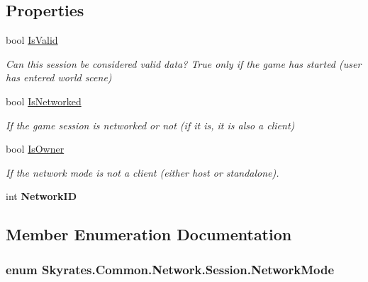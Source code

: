 \subsection*{Properties}
\begin{DoxyCompactItemize}
\item 
bool \hyperlink{class_skyrates_1_1_common_1_1_network_1_1_session_a73011cb9fda86ee41cf5964989d1b9c2}{Is\-Valid}
\begin{DoxyCompactList}\small\item\em Can this session be considered valid data? True only if the game has started (user has entered world scene) \end{DoxyCompactList}\item 
bool \hyperlink{class_skyrates_1_1_common_1_1_network_1_1_session_a9502bbd3da8fd21ef48dd05afd2e3743}{Is\-Networked}
\begin{DoxyCompactList}\small\item\em If the game session is networked or not (if it is, it is also a client) \end{DoxyCompactList}\item 
bool \hyperlink{class_skyrates_1_1_common_1_1_network_1_1_session_a207a8acade7599cf44c03735c2604938}{Is\-Owner}
\begin{DoxyCompactList}\small\item\em If the network mode is not a client (either host or standalone). \end{DoxyCompactList}\item 
\hypertarget{class_skyrates_1_1_common_1_1_network_1_1_session_ab543841394906d3be36e93be1de1413c}{int {\bfseries Network\-I\-D}}\label{class_skyrates_1_1_common_1_1_network_1_1_session_ab543841394906d3be36e93be1de1413c}

\end{DoxyCompactItemize}


\subsection{Member Enumeration Documentation}
\hypertarget{class_skyrates_1_1_common_1_1_network_1_1_session_ad2f4973bc77af540bd68a428e349fbff}{
\subsubsection[{Network\-Mode}]{\setlength{\rightskip}{0pt plus 5cm}enum {\bf Skyrates.\-Common.\-Network.\-Session.\-Network\-Mode}}}\label{class_skyrates_1_1_common_1_1_network_1_1_session_ad2f4973bc77af540bd68a428e349fbff}


